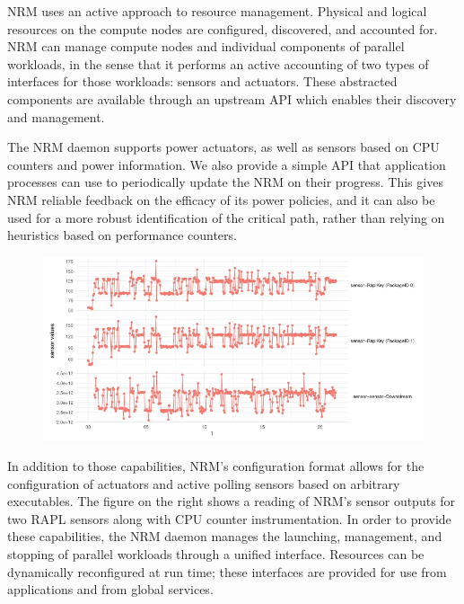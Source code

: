 NRM uses an active approach to resource management. Physical and logical
resources on the compute nodes are configured, discovered, and accounted for.
NRM can manage compute nodes and individual components of parallel workloads,
in the sense that it performs an active accounting of two types of interfaces
for those workloads: sensors and actuators. These abstracted components are
available through an upstream API which enables their discovery and management.

The NRM daemon supports power actuators, as well as sensors based on CPU counters
and power information. We also provide a simple API that application processes
can use to periodically update the NRM on their progress. This gives NRM
reliable feedback on the efficacy of its power policies, and it can also
be used for a more robust identification of the critical path, rather than
relying on heuristics based on performance counters.

\begin{figure}
  \includegraphics[width=.58\textwidth]{projects/2.3.1-PMR/2.3.1.19-Argo-PowerSteering/sensors}
\end{figure}
In addition to those capabilities, NRM's configuration format allows for
the configuration of actuators and active polling sensors based on arbitrary
executables. The figure on the right shows a reading of NRM's sensor
outputs for two RAPL sensors along with CPU counter instrumentation. In order
to provide these capabilities, the NRM daemon manages the launching, management,
and stopping of parallel workloads through a unified interface. Resources
can be dynamically reconfigured at run time; these interfaces are provided
for use from applications and from global services.

